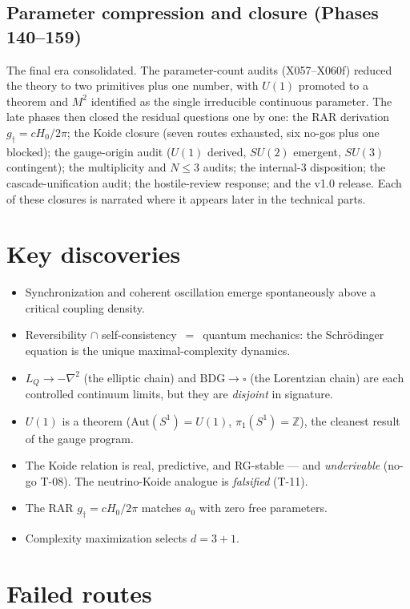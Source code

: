 \documentclass[10pt,twoside,openany]{book}
\begin{document}
\subsection{Parameter compression and closure (Phases 140--159)}

The final era consolidated. The parameter-count audits (X057--X060f) reduced the theory to
two primitives plus one number, with $U(1)$ promoted to a theorem and $M^2$ identified as
the single irreducible continuous parameter. The late phases then closed the residual
questions one by one: the RAR derivation $g_\dagger=cH_0/2\pi$; the Koide closure (seven
routes exhausted, six no-gos plus one blocked); the gauge-origin audit ($U(1)$ derived,
$SU(2)$ emergent, $SU(3)$ contingent); the multiplicity and $N\le3$ audits; the
internal-3 disposition; the cascade-unification audit; the hostile-review response; and
the v1.0 release. Each of these closures is narrated where it appears later in the
technical parts.

\section{Key discoveries}

\begin{itemize}
\item Synchronization and coherent oscillation emerge spontaneously above a critical
coupling density.
\item Reversibility $\cap$ self-consistency $\,=\,$ quantum mechanics: the Schr\"odinger
equation is the unique maximal-complexity dynamics.
\item $L_Q\to-\nabla^2$ (the elliptic chain) and $\mathrm{BDG}\to\square$ (the Lorentzian
chain) are each controlled continuum limits, but they are \emph{disjoint} in signature.
\item $U(1)$ is a theorem ($\mathrm{Aut}(S^1)=U(1)$, $\pi_1(S^1)=\mathbb Z$), the cleanest
result of the gauge program.
\item The Koide relation is real, predictive, and RG-stable --- and \emph{underivable}
(no-go T-08). The neutrino-Koide analogue is \emph{falsified} (T-11).
\item The RAR $g_\dagger=cH_0/2\pi$ matches $a_0$ with zero free parameters.
\item Complexity maximization selects $d=3{+}1$.
\end{itemize}

\section{Failed routes}
\end{document}
